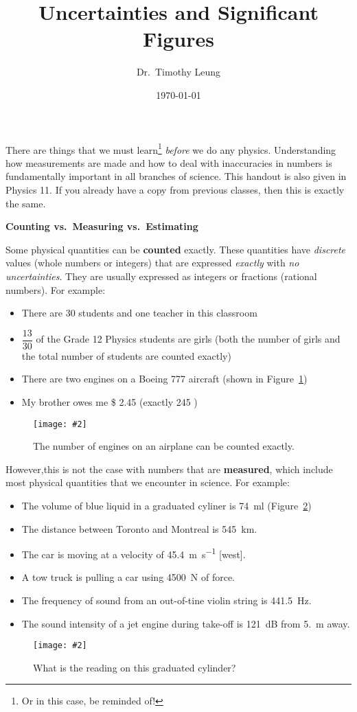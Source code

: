 \documentclass{../../oss-handout}
\title{Uncertainties and Significant Figures}
\author{Dr.\ Timothy Leung}
\date{\today}
\newcommand{\pic}[2]{\texttt{[image: \#2]}}
\begin{document}
\thispagestyle{title}
\gentitle

There are things that we must learn\footnote{Or in this case, be reminded of!}
\emph{before} we do any physics. Understanding how measurements are made and
how to deal with inaccuracies in numbers is fundamentally important in all
branches of science. This handout is also given in Physics 11. If you already
have a copy from previous classes, then this is exactly the same.

\begin{center}
  \textbf{Counting vs.\ Measuring vs.\ Estimating}
\end{center}

Some physical quantities can be \textbf{counted} exactly. These quantities have
\emph{discrete} values (whole numbers or integers) that are expressed
\emph{exactly} with \emph{no uncertainties}. They are usually expressed as
integers or fractions (rational numbers). For example:
\begin{itemize}[nosep]
\item There are 30 students and one teacher in this classroom
\item $\dfrac{13}{30}$ of the Grade 12 Physics students are girls (both the
  number of girls and the total number of students are counted exactly)
\item There are two engines on a Boeing 777 aircraft (shown in
  Figure~\ref{fig:count})
\item My brother owes me \$ 2.45 (exactly 245 \textcent)
\end{itemize}
\begin{figure}[ht]
  \centering
  \pic{.45}{../graphics/1552937371896}
  \caption{The number of engines on an airplane can be counted exactly.}
  \label{fig:count}
\end{figure}

However,this is not the case with numbers that are \textbf{measured}, which
include most physical quantities that we encounter in science. For example:
\begin{itemize}[nosep]
\item The volume of blue liquid in a graduated cyliner is \SI{74}{\milli\litre}
  (Figure~\ref{fig:cylinder})
\item The distance between Toronto and Montreal is \SI{545}{\kilo\metre}.
\item The car is moving at a velocity of \SI{45.4}{\metre\per\second} [west].
\item A tow truck is pulling a car using \SI{4500}{\newton} of force.
\item The frequency of sound from an out-of-tine violin string is
  \SI{441.5}{\hertz}.
\item The sound intensity of a jet engine during take-off is \SI{121}{dB}
  from \SI{5.}{\metre} away.
\end{itemize}
\begin{figure}[ht]
  \centering
  \pic{.4}{../graphics/graduated-cylinder}
  \caption{What is the reading on this graduated cylinder?}
  \label{fig:cylinder}
\end{figure}
\end{document}
